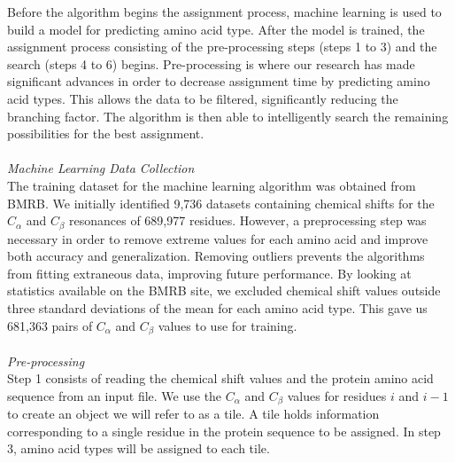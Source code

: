 \documentclass{article}
\begin{document}
Before the algorithm begins the assignment process, machine learning is used to build a model for predicting amino acid type. After the model is trained, the assignment process consisting of the pre-processing steps (steps 1 to 3) and the search (steps 4 to 6) begins. Pre-processing is where our research has made significant advances in order to decrease assignment time by predicting amino acid types. This allows the data to be filtered, significantly reducing the branching factor. The algorithm is then able to intelligently search the remaining possibilities for the best assignment. 
\\\\
\noindent\textit{Machine Learning Data Collection}\\
The training dataset for the machine learning algorithm was obtained from BMRB. We initially identified 9,736 datasets containing chemical shifts for the $C_\alpha$ and $C_\beta$ resonances of 689,977 residues. However, a preprocessing step was necessary in order to remove extreme values for each amino acid and improve both accuracy and generalization. Removing outliers prevents the algorithms from fitting extraneous data, improving future performance. By looking at statistics available on the BMRB site, we excluded chemical shift values outside three standard deviations of the mean for each amino acid type. This gave us 681,363 pairs of $C_\alpha$ and $C_\beta$ values to use for training.
\\\\
\noindent\textit{Pre-processing}\\
Step 1 consists of reading the chemical shift values and the protein amino acid sequence from an input file. We use the $C_\alpha$ and $C_\beta$ values for residues $i$ and $i-1$  to create an object we will refer to as a tile. A tile holds information corresponding to a single residue in the protein sequence to be assigned. In step 3, amino acid types will be assigned to each tile.
\end{document}
